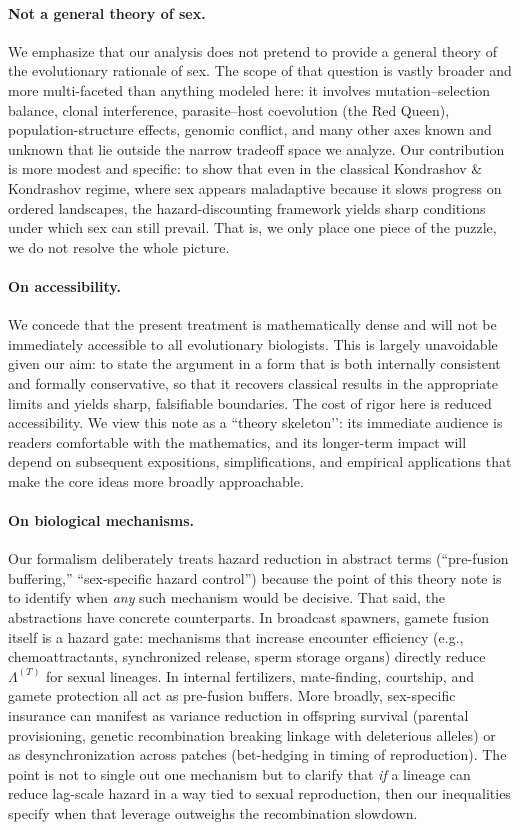 \documentclass[11pt]{article}
\theoremstyle{upright}
\newcommand{\hazT}[1]{\Lambda^{(#1)}}          %
\begin{document}
\paragraph{Not a general theory of sex.}
We emphasize that our analysis does not pretend to provide a general theory of
the evolutionary rationale of sex. The scope of that question is vastly broader
and more multi-faceted than anything modeled here: it involves mutation–selection
balance, clonal interference, parasite–host coevolution (the Red Queen),
population-structure effects, genomic conflict, and many other axes known and unknown that lie
outside the narrow tradeoff space we analyze. Our contribution is more modest and
specific: to show that even in the classical Kondrashov \& Kondrashov regime,
where sex appears maladaptive because it slows progress on ordered landscapes,
the hazard-discounting framework yields sharp conditions under which sex can
still prevail. That is, we only place one piece of the puzzle, we do not resolve the whole picture.

\paragraph{On accessibility.}
We concede that the present treatment is mathematically dense and will not be immediately accessible to all evolutionary biologists. This is largely unavoidable given our aim: to state the argument in a form that is both internally consistent and formally conservative, so that it recovers classical results in the appropriate limits and yields sharp, falsifiable boundaries. The cost of rigor here is reduced accessibility. We view this note as a “theory skeleton’’: its immediate audience is readers comfortable with the mathematics, and its longer-term impact will depend on subsequent expositions, simplifications, and empirical applications that make the core ideas more broadly approachable.

\paragraph{On biological mechanisms.}
Our formalism deliberately treats hazard reduction in abstract terms (``pre-fusion buffering,'' ``sex-specific hazard control'') because the point of this theory note is to identify when \emph{any} such mechanism would be decisive. That said, the abstractions have concrete counterparts. In broadcast spawners, gamete fusion itself is a hazard gate: mechanisms that increase encounter efficiency (e.g., chemoattractants, synchronized release, sperm storage organs) directly reduce $\hazT{T}$ for sexual lineages. In internal fertilizers, mate-finding, courtship, and gamete protection all act as pre-fusion buffers. More broadly, sex-specific insurance can manifest as variance reduction in offspring survival (parental provisioning, genetic recombination breaking linkage with deleterious alleles) or as desynchronization across patches (bet-hedging in timing of reproduction). The point is not to single out one mechanism but to clarify that \emph{if} a lineage can reduce lag-scale hazard in a way tied to sexual reproduction, then our inequalities specify when that leverage outweighs the recombination slowdown.
\end{document}
